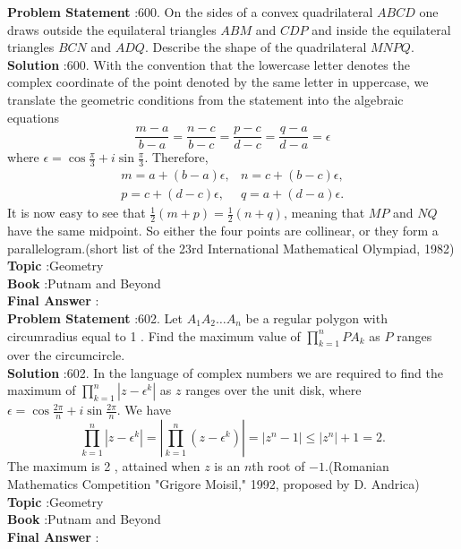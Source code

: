 \documentclass[10pt]{article}
\begin{document}
\textbf{Problem Statement} :600. On the sides of a convex quadrilateral $A B C D$ one draws outside the equilateral triangles $A B M$ and $C D P$ and inside the equilateral triangles $B C N$ and $A D Q$. Describe the shape of the quadrilateral $M N P Q$.\\
\textbf{Solution} :600. With the convention that the lowercase letter denotes the complex coordinate of the point denoted by the same letter in uppercase, we translate the geometric conditions from the statement into the algebraic equations $$ \frac{m-a}{b-a}=\frac{n-c}{b-c}=\frac{p-c}{d-c}=\frac{q-a}{d-a}=\epsilon $$where $\epsilon=\cos \frac{\pi}{3}+i \sin \frac{\pi}{3}$. Therefore,$$ \begin{aligned} m=a+(b-a) \epsilon, & n=c+(b-c) \epsilon, \\ p=c+(d-c) \epsilon, & q=a+(d-a) \epsilon . \end{aligned} $$It is now easy to see that $\frac{1}{2}(m+p)=\frac{1}{2}(n+q)$, meaning that $M P$ and $N Q$ have the same midpoint. So either the four points are collinear, or they form a parallelogram.(short list of the 23rd International Mathematical Olympiad, 1982)\\
\textbf{Topic} :Geometry\\
\textbf{Book} :Putnam and Beyond\\
\textbf{Final Answer} :\\


\textbf{Problem Statement} :602. Let $A_{1} A_{2} \ldots A_{n}$ be a regular polygon with circumradius equal to 1 . Find the maximum value of $\prod_{k=1}^{n} P A_{k}$ as $P$ ranges over the circumcircle. \\
\textbf{Solution} :602. In the language of complex numbers we are required to find the maximum of $\prod_{k=1}^{n}\left|z-\epsilon^{k}\right|$ as $z$ ranges over the unit disk, where $\epsilon=\cos \frac{2 \pi}{n}+i \sin \frac{2 \pi}{n}$. We have$$ \prod_{k=1}^{n}\left|z-\epsilon^{k}\right|=\left|\prod_{k=1}^{n}\left(z-\epsilon^{k}\right)\right|=\left|z^{n}-1\right| \leq\left|z^{n}\right|+1=2 . $$The maximum is 2 , attained when $z$ is an $n$th root of $-1$.(Romanian Mathematics Competition "Grigore Moisil," 1992, proposed by D. Andrica)\\
\textbf{Topic} :Geometry\\
\textbf{Book} :Putnam and Beyond\\
\textbf{Final Answer} :\\
\end{document}

